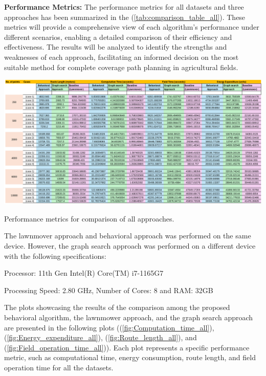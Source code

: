\vspace{3mm}   

\textbf{Performance Metrics: } The performance metrics for all datasets and three approaches has been summarized in the (\autoref{tab:comparison_table_all}). These metrics will provide a comprehensive view of each algorithm's performance under different scenarios, enabling a detailed comparison of their efficiency and effectiveness. The results will be analyzed to identify the strengths and weaknesses of each approach, facilitating an informed decision on the most suitable method for complete coverage path planning in agricultural fields.


\begin{table}[htbp]
    \centering
    \includegraphics[width=\textwidth]{experimental_data/new_table_image.png}
    \caption{Performance metrics for comparison of all approaches.}
    \label{tab:comparison_table_all}
\end{table}


\vspace{3mm}

The lawnmover approach and behavioral approach was performed on the same device. However, the graph search approach was performed on a different device with the following specifications:


Processor: 11th Gen Intel(R) Core(TM) i7-1165G7


Processing Speed: 2.80 GHz, Number of Cores: 8 and RAM: 32GB


\vspace{3mm}


The plots showcasing the results of the comparison among the proposed behavioral algorithm, the lawnmower approach, and the graph search approach are presented in the following plots ((\autoref{fig:Computation_time_all}), (\autoref{fig:Energy_expenditure_all}), (\autoref{fig:Route_length_all}), and (\autoref{fig:Field_operation_time_all})). Each plot represents a specific performance metric, such as computational time, energy consumption, route length, and field operation time for all the datasets. 

